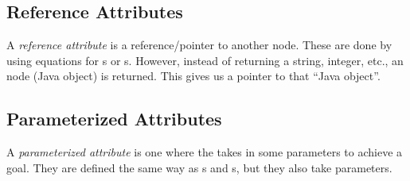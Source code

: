 \subsection{Reference Attributes}\label{subsec:Reference_Attributes}
\begin{definition}\label{def:Reference_Attribute}
  A \emph{reference attribute} is a reference/pointer to another  node.
  These are done by using equations for s or s.
  However, instead of returning a string, integer, etc., an  node (Java object) is returned.
  This gives us a pointer to that ``Java object''.
\end{definition}

\subsection{Parameterized Attributes}\label{subsec:Parameterized_Attributes}
\begin{definition}\label{def:Parameterized_Attribute}
  A \emph{parameterized attribute} is one where the  takes in some parameters to achieve a  goal.
  They are defined the same way as s and s, but they also take parameters.
\end{definition}

